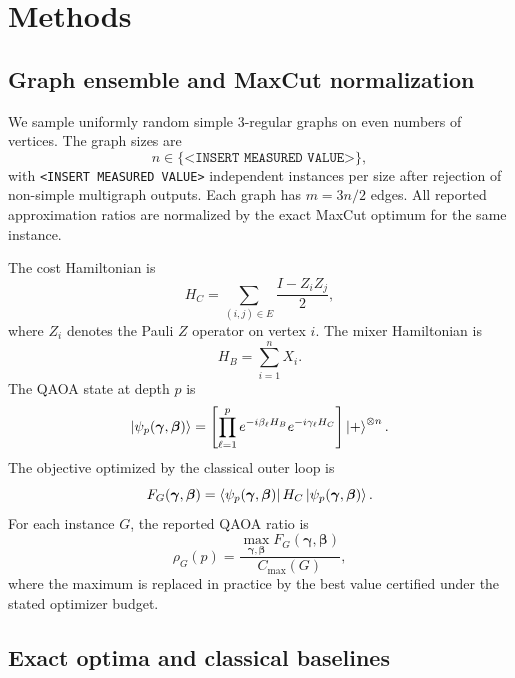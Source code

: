 \documentclass[reprint,aps,longbibliography]{revtex4-2}
\begin{document}
\section{Methods}

\subsection{Graph ensemble and MaxCut normalization}

We sample uniformly random simple 3-regular graphs on even numbers of vertices. The graph sizes are
\begin{equation}
  n\in\{\texttt{<INSERT MEASURED VALUE>}\},
\end{equation}
with \texttt{<INSERT MEASURED VALUE>} independent instances per size after rejection of non-simple multigraph outputs. Each graph has $m=3n/2$ edges. All reported approximation ratios are normalized by the exact MaxCut optimum for the same instance.

The cost Hamiltonian is
\begin{equation}
  H_C=\sum_{(i,j)\in E}\frac{I-Z_iZ_j}{2},
\end{equation}
where $Z_i$ denotes the Pauli $Z$ operator on vertex $i$. The mixer Hamiltonian is
\begin{equation}
  H_B=\sum_{i=1}^{n}X_i.
\end{equation}
The QAOA state at depth $p$ is
\begin{equation}
  \ket{\psi_p(\boldsymbol{\gamma},\boldsymbol{\beta})}
  =
  \left[
  \prod_{\ell=1}^{p}
  e^{-i\beta_\ell H_B}
  e^{-i\gamma_\ell H_C}
  \right]\ket{+}^{\otimes n}.
\end{equation}
The objective optimized by the classical outer loop is
\begin{equation}
  F_G(\boldsymbol{\gamma},\boldsymbol{\beta})
  =
  \bra{\psi_p(\boldsymbol{\gamma},\boldsymbol{\beta})}
  H_C
  \ket{\psi_p(\boldsymbol{\gamma},\boldsymbol{\beta})}.
\end{equation}
For each instance $G$, the reported QAOA ratio is
\begin{equation}
  \rho_G(p)=
  \frac{\max_{\boldsymbol{\gamma},\boldsymbol{\beta}}F_G(\boldsymbol{\gamma},\boldsymbol{\beta})}
  {C_{\max}(G)},
\end{equation}
where the maximum is replaced in practice by the best value certified under the stated optimizer budget.

\subsection{Exact optima and classical baselines}
\end{document}
